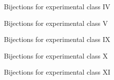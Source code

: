 \begin{figure}[ht!]
    \centering
    
    \caption{Bijections for experimental class IV}
    \label{fig:expgrp_IV}
\end{figure}


\begin{figure}[ht!]
    \centering
    
    \caption{Bijections for experimental class V}
    \label{fig:expgrp_V}
\end{figure}


\begin{comment}
\begin{figure}[ht!]
    \centering
    
    \caption{Bijections for experimental class VI}
    \label{fig:expgrp_VI}
\end{figure}
\end{comment}


\begin{comment}
\begin{figure}[ht!]
    \centering
    
    \caption{Bijections for experimental class VII}
    \label{fig:expgrp_VII}
\end{figure}
\end{comment}


\begin{comment}
\begin{figure}[ht!]
    \centering
    
    \caption{Bijections for experimental class VIII}
    \label{fig:expgrp_VIII}
\end{figure}
\end{comment}


\begin{figure}[ht!]
    \centering
    
    \caption{Bijections for experimental class IX}
    \label{fig:expgrp_IX}
\end{figure}


\begin{figure}[ht!]
    \centering
    
    \caption{Bijections for experimental class X}
    \label{fig:expgrp_X}
\end{figure}


\begin{figure}[ht!]
    \centering
    
    \caption{Bijections for experimental class XI}
    \label{fig:expgrp_XI}
\end{figure}


